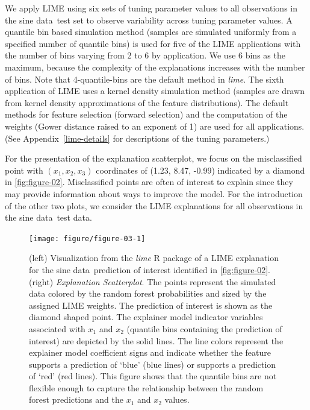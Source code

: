 \documentclass[AMS,STIX2COL]{WileyNJD-v2}\usepackage[]{graphicx}\usepackage[]{color}
\newenvironment{knitrout}{}{} %
\newcommand{\data}{sine data}
\begin{document}
We apply LIME using six sets of tuning parameter values to all observations in the \data \ test set to observe variability across tuning parameter values. A quantile bin based simulation method (samples are simulated uniformly from a specified number of quantile bins) is used for five of the LIME applications with the number of bins varying from 2 to 6 by application. We use 6 bins as the maximum, because the complexity of the explanations increases with the number of bins. Note that 4-quantile-bins are the default method in \emph{lime}. The sixth application of LIME uses a kernel density simulation method (samples are drawn from kernel density approximations of the feature distributions). The default methods for feature selection (forward selection) and the computation of the weights (Gower distance raised to an exponent of 1) are used for all applications. (See Appendix~\ref{lime-details} for descriptions of the tuning parameters.)

For the presentation of the explanation scatterplot, we focus on the misclassified point with $(x_1, x_2, x_3)$ coordinates of (1.23, 8.47, -0.99) indicated by a diamond in \autoref{fig:figure-02}. Misclassified points are often of interest to explain since they may provide information about ways to improve the model. For the introduction of the other two  plots, we consider the LIME explanations for  all observations in the \data \ test data.





\begin{figure}[!thp]
\begin{knitrout}
\color{fgcolor}

{\centering \texttt{[image: figure/figure-03-1]} 

}



\end{knitrout}
\caption{(left) Visualization from the \emph{lime} R package of a LIME explanation for the \data \ prediction of interest identified in \autoref{fig:figure-02}. (right) \emph{Explanation Scatterplot}. The points represent the simulated data colored by the random forest probabilities and sized by the assigned LIME weights. The prediction of interest is shown as the diamond shaped point. The explainer model indicator variables associated with $x_1$ and $x_2$ (quantile bins containing the prediction of interest) are depicted by the solid lines. The line colors represent the explainer model coefficient signs and indicate whether the feature supports a prediction of `blue' (blue lines) or supports a prediction of `red' (red lines). This figure shows that the quantile bins are not flexible enough to capture the relationship between the random forest predictions and the $x_1$ and $x_2$ values.}
\label{fig:figure-03}
\end{figure}
\end{document}
